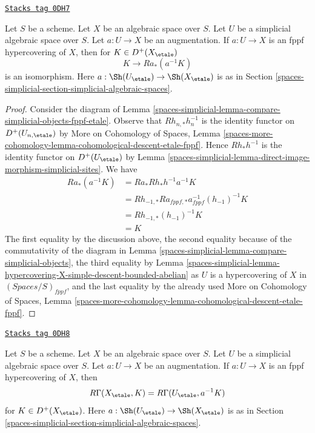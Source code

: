\begin{lemma}
\label{spaces-simplicial-lemma-cohomological-descent-for-fppf-hypercovering}
\href{https://stacks.math.columbia.edu/tag/0DH7}{\texttt{Stacks tag 0DH7}}

Let $S$ be a scheme. Let $X$ be an algebraic space over $S$.
Let $U$ be a simplicial algebraic space over $S$. Let $a : U \to X$
be an augmentation. If $a : U \to X$ is an fppf hypercovering of $X$,
then for $K \in D^+(X_\etale)$
$$
K \to Ra_*(a^{-1}K)
$$
is an isomorphism. Here $a : \Sh(U_\etale) \to \Sh(X_\etale)$
is as in Section \ref{spaces-simplicial-section-simplicial-algebraic-spaces}.
\end{lemma}

\begin{proof}
Consider the diagram of Lemma \ref{spaces-simplicial-lemma-compare-simplicial-objects-fppf-etale}.
Observe that $Rh_{n, *}h_n^{-1}$ is the identity functor
on $D^+(U_{n, \etale})$ by
More on Cohomology of Spaces, Lemma
\ref{spaces-more-cohomology-lemma-cohomological-descent-etale-fppf}.
Hence $Rh_*h^{-1}$ is the identity functor on
$D^+(U_\etale)$ by
Lemma \ref{spaces-simplicial-lemma-direct-image-morphism-simplicial-sites}.
We have
\begin{align*}
Ra_*(a^{-1}K)
& =
Ra_*Rh_*h^{-1}a^{-1}K \\
& =
Rh_{-1, *}Ra_{fppf, *}a_{fppf}^{-1}(h_{-1})^{-1}K \\
& =
Rh_{-1, *}(h_{-1})^{-1}K \\
& =
K
\end{align*}
The first equality by the discussion above, the second equality
because of the commutativity of the diagram in
Lemma \ref{spaces-simplicial-lemma-compare-simplicial-objects}, the third equality by
Lemma \ref{spaces-simplicial-lemma-hypercovering-X-simple-descent-bounded-abelian}
as $U$ is a hypercovering of $X$ in $(\textit{Spaces}/S)_{fppf}$,
and the last equality by the already used
More on Cohomology of Spaces, Lemma
\ref{spaces-more-cohomology-lemma-cohomological-descent-etale-fppf}.
\end{proof}

\begin{lemma}
\label{spaces-simplicial-lemma-compute-via-fppf-hypercovering}
\href{https://stacks.math.columbia.edu/tag/0DH8}{\texttt{Stacks tag 0DH8}}

Let $S$ be a scheme. Let $X$ be an algebraic space over $S$.
Let $U$ be a simplicial algebraic space over $S$. Let $a : U \to X$
be an augmentation. If $a : U \to X$ is an fppf hypercovering of $X$, then
$$
R\Gamma(X_\etale, K) = R\Gamma(U_\etale, a^{-1}K)
$$
for $K \in D^+(X_\etale)$. Here $a : \Sh(U_\etale) \to \Sh(X_\etale)$
is as in Section \ref{spaces-simplicial-section-simplicial-algebraic-spaces}.
\end{lemma}

